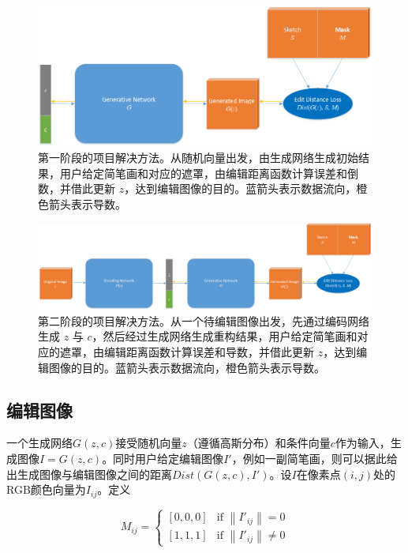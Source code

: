 \documentclass[a4paper,12pt,UTF8]{ctexart}
\newcommand{\norm}[1]{\left\lVert#1\right\rVert}
\newcommand{\kai}{\CJKfamily{zhkai}}	%
\begin{document}
\begin{figure}
  \centering
  \includegraphics[width=1\linewidth]{figs/workflow1.png}
  \caption{\kai 第一阶段的项目解决方法。从随机向量出发，由生成网络生成初始结果，用户给定简笔画和对应的遮罩，由编辑距离函数计算误差和倒数，并借此更新 $z$，达到编辑图像的目的。蓝箭头表示数据流向，橙色箭头表示导数。}
  \label{fig:workflow1}
\end{figure}

\begin{figure}
  \centering
  \includegraphics[width=1\linewidth]{figs/workflow2.png}
  \caption{\kai 第二阶段的项目解决方法。从一个待编辑图像出发，先通过编码网络生成 $z$ 与 $c$，然后经过生成网络生成重构结果，用户给定简笔画和对应的遮罩，由编辑距离函数计算误差和导数，并借此更新 $z$，达到编辑图像的目的。蓝箭头表示数据流向，橙色箭头表示导数。}
  \label{fig:workflow2}
\end{figure}

\subsection{编辑图像}

一个生成网络$G(z, c)$接受随机向量$z$（遵循高斯分布）和条件向量$c$作为输入，生成图像$I = G(z, c)$。同时用户给定编辑图像$I'$，例如一副简笔画，则可以据此给出生成图像与编辑图像之间的距离$Dist(G(z, c), I')$。设$I$在像素点$(i, j)$处的RGB颜色向量为$I_{ij}$。定义

\begin{equation}
  M_{ij} =
  \begin{cases}
    [0, 0, 0]   &  \text{if $\norm{I'_{ij}} = 0$} \\
    [1, 1, 1]   &  \text{if $\norm{I'_{ij}} \neq 0$}
  \end{cases}
\end{equation}
\end{document}
